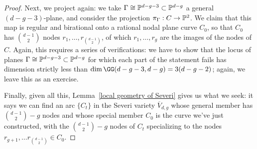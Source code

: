 \begin{proof}
Next, we project again: we take $\Gamma \cong \PP^{d-g-3} \subset \PP^{d-g}$ a general $(d-g-3)$-plane, and consider the projection $\pi_\Gamma : C \to \PP^2$. We claim that this map is regular and birational onto a rational nodal plane curve $C_0$, so that $C_0$ has $\binom{d-1}{2}$ nodes $r_1,\dots,r_{\binom{d-1}{2}}$, of which $r_1,\dots,r_g$ are the images of the nodes of $C$. Again, this requires a series of verifications: we have to show that the locus of planes $\Gamma \cong \PP^{d-g-3} \subset \PP^{d-g}$ for which each part of the statement fails has dimension strictly less than $\dim \GG(d-g-3, d-g) = 3(d-g-2)$; again, we leave this as an exercise.

Finally, given all this, Lemma~\ref{local geometry of Severi} gives us what we seek: it says we can find an arc $\{C_t\}$ in the Severi variety $\overline V_{d,g}$ whose general member has $\binom{d-1}{2} - g$ nodes and whose special member $C_0$ is the curve we've just constructed, with the $\binom{d-1}{2} - g$ nodes of $C_t$ specializing to the nodes $r_{g+1}, \dots r_{\binom{d-1}{2}} \in C_0$.
\end{proof}

